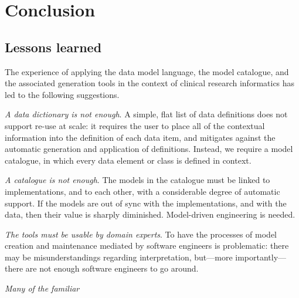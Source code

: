 
\section{Conclusion}

\subsection{Lessons learned}

The experience of applying the data model language, the model
catalogue, and the associated generation tools in the context of
clinical research informatics has led to the following suggestions.

\textsl{A data dictionary is not enough}. A simple, flat list of data
definitions does not support re-use at scale: it requires the user to
place all of the contextual information into the definition of each
data item, and mitigates against the automatic generation and
application of definitions.  Instead, we require a model catalogue, in
which every data element or class is defined in context.

\textsl{A catalogue is not enough}.  The models in the catalogue must
be linked to implementations, and to each other, with a considerable
degree of automatic support.  If the models are out of sync with the
implementations, and with the data, then their value is sharply
diminished.  Model-driven engineering is needed.

\textsl{The tools must be usable by domain experts}. To have the
processes of model creation and maintenance mediated by software
engineers is problematic: there may be misunderstandings regarding
interpretation, but---more importantly---there are not enough software
engineers to go around.  

\textsl{Many of the familiar} 

